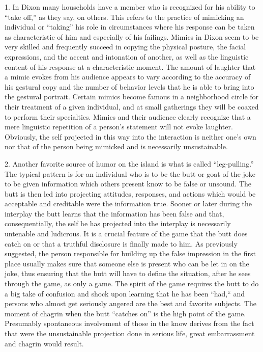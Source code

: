 \documentclass[twoside,symmetric,nobib,justified]{tufte-book}
\begin{document}
1. In Dixon many households have a member who is recognized for his
ability to ``take off,'' as they say, on others. This refers to the
practice of mimicking an individual or ``taking'' his role in
circumstances where his response can be taken as characteristic of him
and especially of his failings. Mimics in Dixon seem to be very skilled
and frequently succeed in copying the physical posture, the facial
expressions, and the accent and intonation of another, as well as the
linguistic content of his response at a characteristic moment. The
amount of laughter that a mimic evokes from his audience appears to vary
according to the accuracy of his gestural copy and the number of
behavior levels that he is able to bring into the gestural portrait.
Certain mimics become famous in a neighborhood circle for their
treatment of a given individual, and at small gatherings they will be
coaxed to perform their specialties. Mimics and their audience clearly
recognize that a mere linguistic repetition of a person's statement will
not evoke laughter. Obviously, the self projected in this way into the
interaction is neither one's own nor that of the person being mimicked
and is necessarily unsustainable.

2. Another favorite source of humor on the island is what is called
``leg-pulling.'' The typical pattern is for an individual who is to be
the butt or goat of the joke to be given information which others
present know to be false or unsound. The butt is then led into
projecting attitudes, responses, and actions which would be acceptable
and creditable were the information true. Sooner or later during the
interplay the butt learns that the information has been false and that,
consequentially, the self he has projected into the interplay is
necessarily untenable and ludicrous. It is a crucial feature of the game
that the butt does catch on or that a truthful disclosure is finally
made to him. As previously suggested, the person responsible for
building up the false impression in the first place usually makes sure
that someone else is present who can be let in on the joke, thus
ensuring that the butt will have to define the situation, after he sees
through the game, as only a game. The spirit of the game requires the
butt to do a big take of confusion and shock upon learning that he has
been ``had,`` and persons who almost get seriously angered are the best
and favorite subjects. The moment of chagrin when the butt ``catches
on'' is the high point of the game. Presumably spontaneous involvement
of those in the know derives from the fact that were the unsustainable
projection done in serious life, great embarrassment and chagrin would
result.
\end{document}
